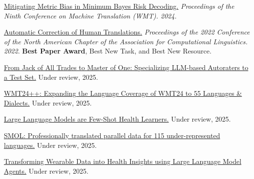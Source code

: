 
\href{https://aclanthology.org/2024.wmt-1.109.pdf}{Mitigating Metric Bias in Minimum Bayes Risk Decoding.} \emph{Proceedings of the Ninth Conference on Machine Translation (WMT). 2024.}

\href{https://aclanthology.org/2022.naacl-main.36.pdf}{Automatic Correction of Human Translations.} \emph{Proceedings of the 2022 Conference of the North American Chapter of the Association for Computational Linguistics. 2022}. \textbf{Best Paper Award}, Best New Task, and Best New Resource. %

\href{https://arxiv.org/pdf/2411.15387}{From Jack of All Trades to Master of One: Specializing LLM-based Autoraters to a Test Set.} Under review, 2025.

\href{https://arxiv.org/pdf/2502.12404}{WMT24++: Expanding the Language Coverage of WMT24 to 55 Languages \& Dialects.} Under review, 2025.

\href{https://arxiv.org/pdf/2305.15525}{Large Language Models are Few-Shot Health Learners.} Under review, 2025.

\href{https://arxiv.org/pdf/2502.12301}{SMOL: Professionally translated parallel data for 115 under-represented languages.} Under review, 2025.

\href{https://arxiv.org/pdf/2406.06464}{Transforming Wearable Data into Health Insights using Large Language Model Agents.} Under review, 2025.

